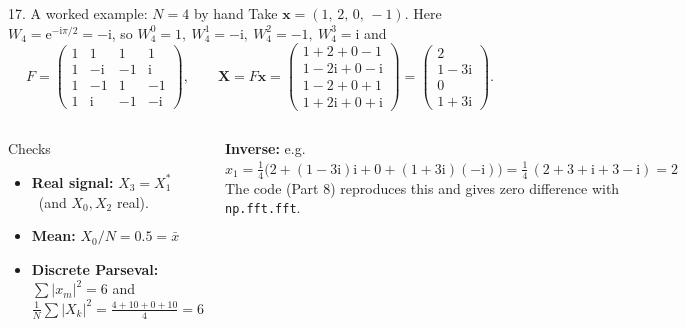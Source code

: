 \documentclass[aspectratio=169,10pt]{beamer}
\newcommand{\ii}{\mathrm{i}}
\newcommand{\ee}{\mathrm{e}}
\begin{document}
\begin{frame}{17. A worked example: $N=4$ by hand}
  \small
  Take $\mathbf x=(1,\,2,\,0,\,-1)$. Here $W_4=\ee^{-\ii\pi/2}=-\ii$, so $W_4^0=1,\ W_4^1=-\ii,\ W_4^2=-1,\ W_4^3=\ii$ and
  \[
    F=\begin{pmatrix}1&1&1&1\\1&-\ii&-1&\ii\\1&-1&1&-1\\1&\ii&-1&-\ii\end{pmatrix}\!,\qquad
    \mathbf X=F\mathbf x=\begin{pmatrix}1+2+0-1\\ 1-2\ii+0-\ii\\ 1-2+0+1\\ 1+2\ii+0+\ii\end{pmatrix}=\begin{pmatrix}2\\1-3\ii\\0\\1+3\ii\end{pmatrix}.
  \]
  \begin{columns}[T]
    \begin{keybox}{Checks}
      \footnotesize
      \begin{itemize}
        \item \textbf{Real signal:} $X_3=X_1^{*}$ \checkmark\ (and $X_0,X_2$ real).
        \item \textbf{Mean:} $X_0/N=0.5=\bar x$ \checkmark
        \item \textbf{Discrete Parseval:} $\sum|x_m|^2=6$ and $\frac1N\sum|X_k|^2=\frac{4+10+0+10}{4}=6$ \checkmark
      \end{itemize}
    \end{keybox}
    \textbf{Inverse:} e.g. $x_1=\tfrac14\big(2+(1-3\ii)\ii+0+(1+3\ii)(-\ii)\big)=\tfrac14\,(2+3+\ii+3-\ii)=2$ \checkmark\\[3pt]
    \footnotesize The code (Part 8) reproduces this and gives zero difference with \texttt{np.fft.fft}.
  \end{columns}
\end{frame}
\end{document}
